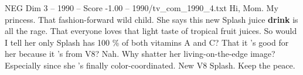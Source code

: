 \begin{textsample}{NEG Dim 3 – 1990 – Score -1.00 – 1990/tv\_com\_1990\_4.txt}  \label{ex:f3_neg_027}
Hi, Mom.
My princess.
That fashion-forward wild child.
She says this new Splash juice \textbf{drink} is all the rage.
That everyone loves that light taste of tropical fruit juices.
So would I tell her only Splash has 100 \% of both vitamins A and C?
That it 's good for her because it 's from V8?
Nah.
Why shatter her living-on-the-edge image?
Especially since she 's finally color-coordinated.
New V8 Splash.
Keep the peace.

\end{textsample}
